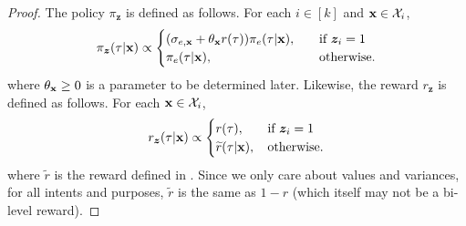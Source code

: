 \begin{proof}
The policy $\pi_{\bm{z}}$ is defined as follows. For each $i \in [k]$ and $\mathbf{x} \in \mathcal{X}_i$,
\begin{align}
    \pi_{\bm{z}} (\tau|\mathbf{x}) \propto \begin{cases}
        (\sigma_{e,\mathbf{x}} + \theta_{\mathbf{x}} r(\tau))\pi_e(\tau|\mathbf{x}), \quad &\text{if } \bm{z}_i = 1 \\
        \pi_e(\tau|\mathbf{x}), &\text{otherwise.}
    \end{cases}
\end{align}
where $\theta_{\mathbf{x}} \ge 0$ is a parameter to be determined later. Likewise, the reward $r_{\bm{z}}$ is defined as follows. For each $\mathbf{x} \in \mathcal{X}_i$,
\begin{align}
    r_{\bm{z}} (\tau|\mathbf{x}) \propto \begin{cases}
        r(\tau), \quad &\text{if } \bm{z}_i = 1 \\
        \widetilde{r} (\tau|\mathbf{x}), &\text{otherwise.}
    \end{cases}
\end{align}
where $\widetilde{r}$ is the reward defined in . Since we only care about values and variances, for all intents and purposes, $\widetilde{r}$ is the same as $1-r$ (which itself may not be a bi-level reward).


\end{proof}
